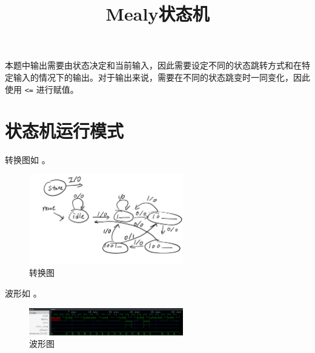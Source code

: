 \documentclass[lang=cn]{elegantpaper}
\title{Mealy状态机}
\begin{document}
\maketitle



本题中输出需要由状态决定和当前输入，因此需要设定不同的状态跳转方式和在特定输入的情况下的输出。对于输出来说，需要在不同的状态跳变时一同变化，因此使用 \lstinline{<=} 进行赋值。


 \section{状态机运行模式}

转换图如  。

\begin{figure}[htb]
    \centering
    \caption{转换图}\label{01}
    \includegraphics[width=0.6\textwidth]{trans.png}
\end{figure}




波形如  。


\begin{figure}[htb]
    \centering
    \caption{波形图}\label{02}
    \includegraphics[width=0.6\textwidth]{wave.png}
\end{figure}
\end{document}
